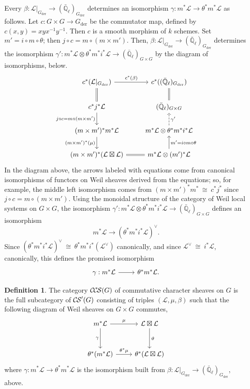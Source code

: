 \documentclass[10pt]{amsart}
\theoremstyle{plain}
\theoremstyle{definition}
\newtheorem{definition}[theorem]{Definition}
\newcommand{\EE}{\mathbb{\bar Q}_\ell}
\newcommand{\Fq}{k}
\newcommand{\der}{_{\operatorname{der}}}
\newcommand{\iso}{{\ \cong\ }}
\newcommand{\cs}[1]{{\mathcal{#1}}}
\newcommand{\CS}{{\mathcal{C\hskip-0.8pt S}}}
\newcommand{\CCS}{{\mathcal{C\hskip-.8pt C\hskip-0.8pt S}}}
\begin{document}
Every $\beta : \cs{L}\vert_{G\der} \to (\EE)_{G\der}$ determines an isomorphism $\gamma : m^*\cs{L} \to \theta^*m^*\cs{L}$ as follows.
Let $c : G\times G\to G\der$ be the commutator map, defined by $c(x,y)= xyx^{-1}y^{-1}$.
Then $c$ is a smooth morphism of $\Fq$ schemes.
Set $m' = i \circ m \circ \theta$; then $j\circ c = m \circ (m \times m')$.
Then, $\beta : \cs{L}\vert_{G\der} \to (\EE)_{G\der}$ determines the isomorphism $\gamma' : m^*\cs{L} \otimes \theta^* m^* i^*\cs{L} \to (\EE)_{G\times G}$ by the diagram of isomorphisms, below.
\begin{equation}
\begin{tikzcd}
\arrow[equal]{d} c^* (\cs{L}\vert_{G\der}) \arrow{r}{c^*(\beta)} 
	&  c^*((\EE)_{G\der}) \arrow[equal]{d} \\
\arrow{d}[swap]{j\circ c = m \circ (m \times m')} c^* j^* \cs{L} 
	&   (\EE)_{G\times G} \\
(m \times m')^* m^* \cs{L} \arrow{d}[swap]{(m \times m')^*(\mu)} 
	&  m^*\cs{L} \otimes \theta^* m^* i^* \cs{L}  \arrow[dashed]{u}[swap]{\gamma'} \\
(m \times m')^* (\cs{L} \boxtimes \cs{L}) \arrow[equal]{r} 
	& m^*\cs{L} \otimes (m')^*\cs{L} \arrow{u}[swap]{m' = i\circ m\circ \theta} 
\end{tikzcd}
\end{equation}
In the diagram above, the arrows labeled with equations come from canonical isomorphisms of functors on Weil sheaves derived from the equations; so, for example, the middle left isomorphism comes from $(m\times m')^* m^* \iso c^* j^*$ since $j\circ c = m \circ (m \times m')$.
Using the monoidal structure of the category of Weil local systems on $G\times G$, the isomorphism $\gamma' : m^*\cs{L} \otimes \theta^* m^* i^*\cs{L} \to (\EE)_{G\times G}$ defines an isomorphism
\[
m^*\cs{L} \to (\theta^* m^* i^*\cs{L})^\vee.
\]
Since $(\theta^* m^* i^*\cs{L})^\vee \iso \theta^* m^* i^* (\cs{L}^\vee)$ canonically, and since $\cs{L}^\vee \iso i^*\cs{L}$, canonically, this defines the promised isomorphism
\[
\begin{tikzcd}
\gamma : m^*\cs{L} \arrow{r} & \theta^* m^* \cs{L}.
\end{tikzcd}
\]

\begin{definition}\label{def:CCS}
The category $\CCS(G)$ of commutative character sheaves on $G$ is the full subcategory of $\CS'(G)$ consisting of triples $(\cs{L},\mu,\beta)$ such that the following diagram of Weil sheaves on $G \times G$ commutes,
  \[
  \begin{tikzcd}[row sep=30]
   m^*\cs{L} \arrow{d}[swap]{\gamma} \arrow{r}{\mu} & \cs{L}\boxtimes\cs{L} \arrow{d}{\vartheta}\\
   \theta^*(m^*\cs{L}) \arrow{r}{{\theta}^*\mu} &  \theta^*(\cs{L}\boxtimes\cs{L})
  \end{tikzcd}
  \]
where $\gamma : m^*\cs{L} \to \theta^* m^* \cs{L}$ is the isomorphism built from $\beta : \cs{L}\vert_{G\der} \to (\EE)_{G\der}$, above.
\end{definition}
\end{document}
